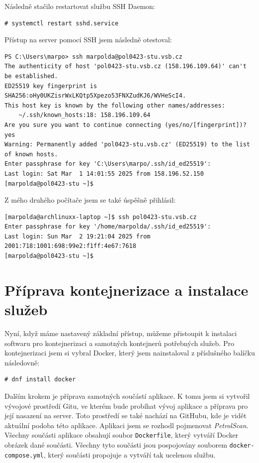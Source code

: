 Následně stačilo restartovat službu SSH Daemon:

\begin{verbatim}
# systemctl restart sshd.service
\end{verbatim}

Přístup na server pomocí SSH jsem následně otestoval:
\begin{verbatim}
PS C:\Users\marpo> ssh marpolda@pol0423-stu.vsb.cz
The authenticity of host 'pol0423-stu.vsb.cz (158.196.109.64)' can't be established.
ED25519 key fingerprint is SHA256:oHy0UKZisrWxLKQtp5Xpezo53FNXZudKJ6/WVHeScI4.
This host key is known by the following other names/addresses:
    ~/.ssh/known_hosts:18: 158.196.109.64
Are you sure you want to continue connecting (yes/no/[fingerprint])? yes
Warning: Permanently added 'pol0423-stu.vsb.cz' (ED25519) to the list of known hosts.
Enter passphrase for key 'C:\Users\marpo/.ssh/id_ed25519':
Last login: Sat Mar  1 14:01:55 2025 from 158.196.52.150
[marpolda@pol0423-stu ~]$
\end{verbatim}

Z mého druhého počítače jsem se také úspěšně přihlásil:
\begin{verbatim}
[marpolda@archlinuxx-laptop ~]$ ssh pol0423-stu.vsb.cz
Enter passphrase for key '/home/marpolda/.ssh/id_ed25519':
Last login: Sun Mar  2 19:21:04 2025 from 2001:718:1001:698:99e2:f1ff:4e67:7618
[marpolda@pol0423-stu ~]$
\end{verbatim}

\section{Příprava kontejnerizace a instalace služeb}
\label{sec:containers-preps-services-install}

Nyní, když máme nastavený základní přístup, můžeme přistoupit
k instalaci softwaru pro kontejnerizaci a samotných kontejnerů
potřebných služeb. Pro kontejnerizaci jsem si vybral Docker,
který jsem nainstaloval z příslušného balíčku následovně:

\begin{verbatim}
# dnf install docker
\end{verbatim}

Dalším krokem je příprava samotných součástí aplikace. K tomu
jsem si vytvořil vývojové prostředí Gitu, ve kterém bude
probíhat vývoj aplikace a příprava pro její nasazení na server.
Toto prostředí se také nachází na GitHubu, kde je vidět
aktuální podoba této aplikace. Aplikaci jsem se rozhodl pojmenovat
\emph{PetrolScan}. Všechny součásti aplikace obsahují soubor
\texttt{Dockerfile}, který vytváří Docker obrázek dané součásti.
Všechny tyto součásti jsou pospojovány souborem \texttt{docker-compose.yml},
který součásti propojuje a vytváří tak ucelenou službu.

